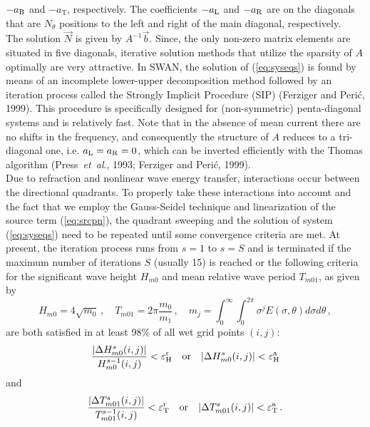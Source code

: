 \documentclass[12pt]{book}
\begin{document}
$-a_{\rm B}$ and $-a_{\mathrm{T}}$, respectively. The coefficients $-a_{\rm L}$ and $-a_{\rm R}$
are on the diagonals that are $N_{\theta}$ positions to the left and
right of the main diagonal, respectively.
\\[2ex]
\noindent
The solution $\vec{N}$ is given by $A^{-1} \vec{b}$. Since, the only non-zero matrix elements are situated in five diagonals,
iterative solution methods that utilize the sparsity of $A$ optimally are very attractive.
In SWAN,
the solution of (\ref{eq:syseqs}) is found by means of an incomplete lower-upper decomposition method followed by an
iteration process called the
Strongly Implicit Procedure (SIP) (Ferziger and Peri\'{c}, 1999). This procedure is specifically designed for
(non-symmetric) penta-diagonal systems and is relatively fast.
Note that in the absence of mean current there are no shifts
in the frequency, and consequently the structure of $A$ reduces to a tri-diagonal one, i.e.
$a_{\rm L} = a_{\rm R} = 0$, which can be inverted efficiently with
the Thomas algorithm (Press~{\it et~al}., 1993; Ferziger and Peri\'{c}, 1999).
\nocite{Fer99P}
\\[2ex]
\noindent
Due to refraction and nonlinear wave energy transfer, interactions occur
between the directional quadrants. To properly take these interactions into
account and the fact that we employ the Gauss-Seidel technique and linearization of the source term (\ref{eq:srcpn}),
the quadrant sweeping and the solution of system (\ref{eq:syseqs})
need to be repeated until some convergence criteria are met. At present,
the iteration process runs from $s = 1$ to $s = S$ and is terminated if the maximum number of
iterations $S$ (usually 15) is reached or the following criteria for the significant wave height $H_{m0}$ and mean
relative wave period $T_{m01}$, as given by
\begin{equation}
  H_{m0} = 4\sqrt{m_0}\, , \quad T_{m01} = 2\pi \frac{m_0}{m_1}\, , \quad
  m_j = \int_{0}^{\infty} \int_{0}^{2\pi} \sigma^j E(\sigma,\theta) d\sigma d\theta \, ,
\end{equation}
are both satisfied in at least 98\% of all wet grid points $(i,j)$:
\begin{equation}
  \frac{|\Delta H^{s}_{m0}(i,j)|}{H^{s-1}_{m0}(i,j)} <
  {\varepsilon}^{\rm r}_{\rm H} \quad \mbox{or} \quad
  |\Delta H^{s}_{m0}(i,j)| <
  {\varepsilon}^{\rm a}_{\rm H}
  \label{eq:stop}
\end{equation}
and
\begin{equation}
  \frac{|\Delta T^{s}_{m01}(i,j)|}{T^{s-1}_{m01}(i,j)} <
  {\varepsilon}^{\mathrm{r}}_{\mathrm{T}} \quad \mbox{or} \quad
  |\Delta T^{s}_{m01}(i,j)| <
  {\varepsilon}^{\rm a}_{\rm T} \, .
  \label{eq:stop2}
\end{equation}
\end{document}
